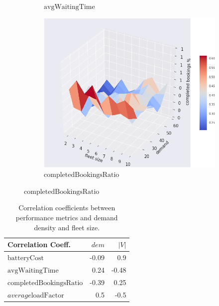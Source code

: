 \documentclass[12pt,a4paper]{article}
\begin{document}
\begin{figure}
\begin{subfigure}[b]{0.45\textwidth}
  \caption{$\text{avgWaitingTime}$}
  \label{wtcost}
\end{subfigure}
\begin{subfigure}[b]{0.458\textwidth}
  \includegraphics[width=\linewidth]{./images/completed.png}
  \caption{$\text{completedBookingsRatio}$}
  \label{cbr}
\end{subfigure}

\label{simustate}
\end{figure}


  \begin{table}
  \caption{Correlation coefficients between performance metrics and demand density and fleet size.}
  \vspace{-1.5em}
  \center
    \begin{tabular}{|l|r|r|}
     \toprule
    Correlation Coeff.& $dem$ & $|V|$ \\
    \midrule
    $\text{batteryCost}$ & -0.09 & 0.9\\
    $\text{avgWaitingTime}$ & 0.24 & -0.48\\
    $\text{completedBookingsRatio}$ & -0.39 & 0.25 \\
    $average\text{loadFactor}$ & 0.5 & -0.5\\
    \midrule
    \end{tabular}
    \label{correlation}
  \end{table}
\end{document}
